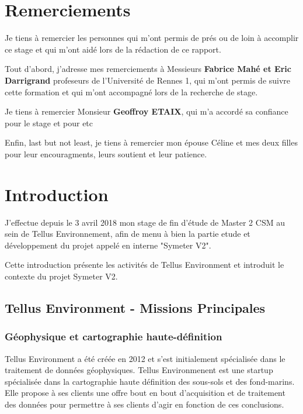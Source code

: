 \documentclass[12pt,a4paper]{report}
\begin{document}
\chapter*{Remerciements}%
\thispagestyle{empty}%


Je tiens à remercier les personnes qui m'ont permis de prés ou de loin à accomplir ce stage et qui m'ont aidé lors de la rédaction de ce rapport.

Tout d'abord, j'adresse mes remerciements à Messieurs \textbf{Fabrice Mahé et Eric Darrigrand} profeseurs de l'Université de Rennes 1, qui m'ont permis de suivre cette formation et qui m'ont accompagné lors de la recherche de stage.

Je tiens à remercier Monsieur \textbf{Geoffroy ETAIX}, qui m'a accordé sa confiance pour le stage et pour etc 

Enfin, last but not least, je tiens à remercier mon épouse Céline et mes deux filles pour leur encouragments, leurs soutient et leur patience.



\setcounter{tocdepth}{5}
\tableofcontents
\newpage

\chapter{Introduction}

J'effectue depuis le 3 avril 2018 mon stage de fin d'étude de Master 2 CSM au sein de Tellus Environnement, afin de menu à bien la partie etude et développement du projet appelé en interne "Symeter V2".

\para Cette introduction présente les activités de Tellus Environment et introduit le contexte du projet Symeter V2.

	\section{Tellus Environment - Missions Principales}

	\subsection{Géophysique et cartographie haute-définition}
	Tellus Environment a été créée en 2012 et s'est initialement spécialisée dans le traitement de données géophysiques.
	Tellus Environmenent est une startup spécialisée dans la cartographie haute définition des sous-sols et des fond-marins. Elle propose à ses clients une offre bout en bout d'acquisition et de traitement des données pour permettre à ses clients d'agir en fonction de ces conclusions.
	
\end{document}
